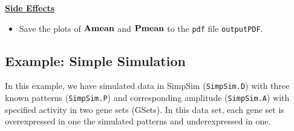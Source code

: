 \documentclass{report}
\begin{document}
\par \noindent \textbf{\underline{Side Effects}}
\begin{itemize}
  \item Save the plots of ${\bf{Amean}}$ and ${\bf{Pmean}}$ to the \texttt{pdf} file \texttt{outputPDF}.
\end{itemize}

\subsection{Example: Simple Simulation}

\par In this example, we have simulated data in SimpSim (\texttt{SimpSim.D}) with three known patterns (\texttt{SimpSim.P}) and corresponding amplitude (\texttt{SimpSim.A}) with specified activity in two gene sets (GSets).  In this data set, each gene set is overexpressed in one the simulated patterns and underexpressed in one.
\end{document}
